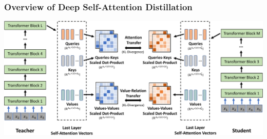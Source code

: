 \documentclass{beamer}
\begin{document}
\begin{frame}
    \frametitle{Overview of Deep Self-Attention Distillation}
    \begin{center}
        \includegraphics[scale=0.285]{img/mini_lm_distillation.png}
    \end{center}
\end{frame}
\end{document}
